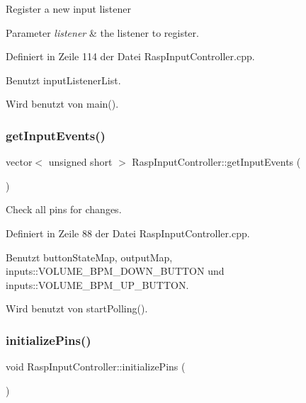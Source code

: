Register a new input listener 
\begin{DoxyParams}{Parameter}
{\em listener} & the listener to register. \\
\hline
\end{DoxyParams}


Definiert in Zeile 114 der Datei Rasp\+Input\+Controller.\+cpp.



Benutzt input\+Listener\+List.



Wird benutzt von main().

\mbox{\label{class_rasp_input_controller_a95a42703b4c0bca34ba966745bad5dff}} 
\subsubsection{\texorpdfstring{get\+Input\+Events()}{getInputEvents()}}
{\footnotesize\ttfamily vector$<$ unsigned short $>$ Rasp\+Input\+Controller\+::get\+Input\+Events (\begin{DoxyParamCaption}{ }\end{DoxyParamCaption})\hspace{0.3cm}{\ttfamily [private]}}



Check all pins for changes. 



Definiert in Zeile 88 der Datei Rasp\+Input\+Controller.\+cpp.



Benutzt button\+State\+Map, output\+Map, inputs\+::\+V\+O\+L\+U\+M\+E\+\_\+\+B\+P\+M\+\_\+\+D\+O\+W\+N\+\_\+\+B\+U\+T\+T\+ON und inputs\+::\+V\+O\+L\+U\+M\+E\+\_\+\+B\+P\+M\+\_\+\+U\+P\+\_\+\+B\+U\+T\+T\+ON.



Wird benutzt von start\+Polling().

\mbox{\label{class_rasp_input_controller_a5ffc6f68b0c74f31a9b595ff8acc49f1}} 
\subsubsection{\texorpdfstring{initialize\+Pins()}{initializePins()}}
{\footnotesize\ttfamily void Rasp\+Input\+Controller\+::initialize\+Pins (\begin{DoxyParamCaption}{ }\end{DoxyParamCaption})\hspace{0.3cm}{\ttfamily [private]}}



